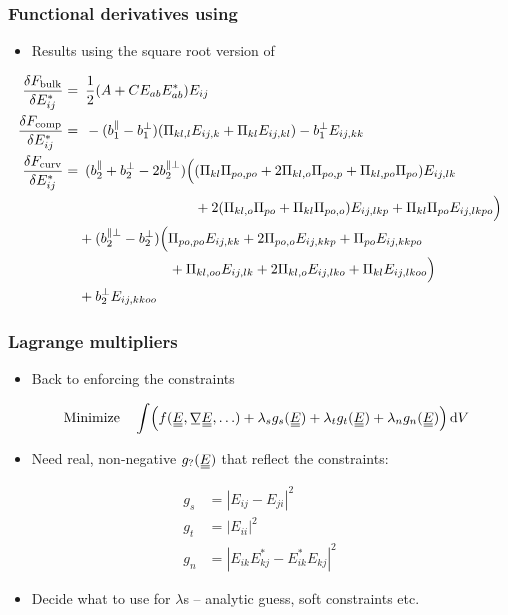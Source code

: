 \documentclass[10pt,mathserif]{beamer}
\begin{document}
\begin{frame}
    \frametitle{Functional derivatives using \PP}
    \begin{itemize}
        \item Results using the square root version of \PP
    \end{itemize}
    \small
    \begin{align*}
        \fdv{F_\text{bulk}}{E_{ij}^*} =&\enspace \frac{1}{2}\qty(A + C E_{ab}E_{ab}^*)E_{ij} \\
        \fdv{F_\text{comp}}{E_{ij}^*} =&\enspace -(b_1^\parallel - b_1^\perp) (\Pi_{kl,l} E_{ij,k} + \Pi_{kl} E_{ij,kl}) - b_1^\perp E_{ij,kk} \\
        \fdv{F_\text{curv}}{E_{ij}^*} =&\enspace (b_2^\parallel + b_2^\perp - 2b_2^{\parallel\perp}) \Bigl( (\Pi_{kl}\Pi_{po,po} + 2\Pi_{kl,o}\Pi_{po,p} + \Pi_{kl,po}\Pi_{po})E_{ij,lk} \\
        &\phantom{\enspace (b_2^\parallel + b_2^\perp - 2b_2^{\parallel\perp}) \Bigl(}+ 2(\Pi_{kl,o}\Pi_{po} + \Pi_{kl}\Pi_{po,o})E_{ij,lkp} + \Pi_{kl}\Pi_{po}E_{ij,lkpo} \Bigr) \nonumber \\
        &+ (b_2^{\parallel\perp} - b_2^\perp)\Bigl( \Pi_{po,po}E_{ij,kk} + 2\Pi_{po,o}E_{ij,kkp} + \Pi_{po}E_{ij,kkpo} \nonumber \\ 
        &\phantom{\enspace+ (b_2^{\parallel\perp} - b_2^\perp)\Bigl(}+ \Pi_{kl,oo}E_{ij,lk} + 2\Pi_{kl,o}E_{ij,lko} + \Pi_{kl}E_{ij,lkoo} \Bigr) \nonumber \\ 
        &+ b_2^\perp E_{ij,kkoo} \nonumber
    \end{align*}
\end{frame}

\begin{frame}
    \frametitle{Lagrange multipliers}
    \begin{itemize}
        \item Back to enforcing the constraints
    \end{itemize}
    \begin{align*}
        \qq{Minimize} \int \Bigl(f(\du{E}, \su{\nabla}\du{E}, \ldots) + \lambda_s g_s(\du{E}) + \lambda_t g_t(\du{E}) + \lambda_n g_n(\du{E})\Bigr) \dd{V}
    \end{align*}
    \begin{itemize}
        \item Need real, non-negative $g_?(\du{E})$ that reflect the constraints:
    \end{itemize}
    \begin{align*}
        g_s &= |E_{ij} - E_{ji}|^2 \\
        g_t &= |E_{ii}|^2 \\
        g_n &= |E_{ik}E_{kj}^* - E_{ik}^*E_{kj}|^2
    \end{align*}
    \begin{itemize}
        \item Decide what to use for $\lambda$s -- analytic guess, soft constraints etc.
    \end{itemize}
\end{frame}
\end{document}
